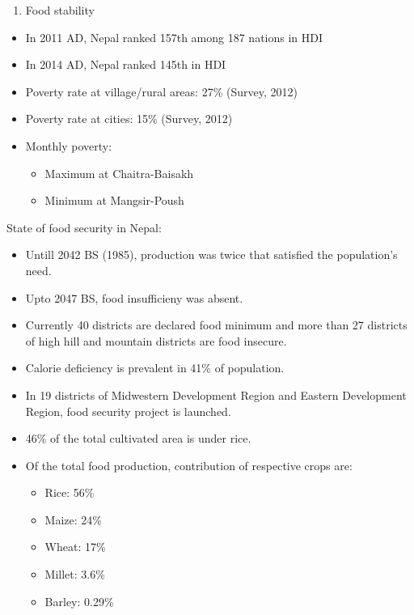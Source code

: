 \documentclass[
  openany]{book}
\providecommand{\tightlist}{%
  \setlength{\itemsep}{0pt}\setlength{\parskip}{0pt}}
\begin{document}
\begin{enumerate}
\def\labelenumi{\arabic{enumi}.}
\setcounter{enumi}{3}
\tightlist
\item
  Food stability
\end{enumerate}

\begin{itemize}
\tightlist
\item
  In 2011 AD, Nepal ranked 157th among 187 nations in HDI
\item
  In 2014 AD, Nepal ranked 145th in HDI
\item
  Poverty rate at village/rural areas: 27\% (Survey, 2012)
\item
  Poverty rate at cities: 15\% (Survey, 2012)
\item
  Monthly poverty:

  \begin{itemize}
  \tightlist
  \item
    Maximum at Chaitra-Baisakh
  \item
    Minimum at Mangsir-Poush
  \end{itemize}
\end{itemize}

State of food security in Nepal:

\begin{itemize}
\tightlist
\item
  Untill 2042 BS (1985), production was twice that satisfied the population's need.
\item
  Upto 2047 BS, food insufficieny was absent.
\item
  Currently 40 districts are declared food minimum and more than 27 districts of high hill and mountain districts are food insecure.
\item
  Calorie deficiency is prevalent in 41\% of population.
\item
  In 19 districts of Midwestern Development Region and Eastern Development Region, food security project is launched.
\item
  46\% of the total cultivated area is under rice.
\item
  Of the total food production, contribution of respective crops are:

  \begin{itemize}
  \tightlist
  \item
    Rice: 56\%
  \item
    Maize: 24\%
  \item
    Wheat: 17\%
  \item
    Millet: 3.6\%
  \item
    Barley: 0.29\%
  \end{itemize}
\end{itemize}
\end{document}
